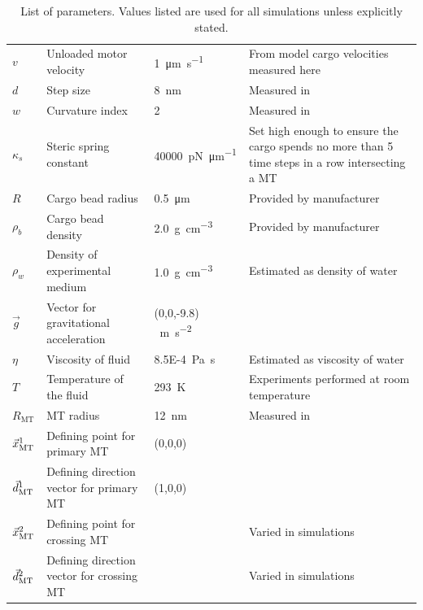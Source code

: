 \begin{table}
\begin{tabular}{p{.08\linewidth} p{.3\linewidth} p{.15\linewidth} p{.3\linewidth}}
$v$ & Unloaded motor velocity & \SI{1}{\micro\meter\per\second} & From model cargo velocities measured here \\

$d$ & Step size & \SI{8}{\nano\meter} & Measured in \cite{Svoboda1993} \\

$w$ & Curvature index & \num{2} & Measured in \cite{Visscher1999,Fallesen2011}  \\ \hline

$\kappa_s$ & Steric spring constant & \SI{40000}{\pico\newton\per\micro\meter} & Set high enough to ensure the cargo spends no more than 5 time steps in a row intersecting a MT \\

$R$ & Cargo bead radius & \SI{.5}{\micro\meter} & Provided by manufacturer \\

$\rho_b$ & Cargo bead density & \SI{2.0}{\gram\per\centi\meter^3} & Provided by manufacturer\\

$\rho_w$ & Density of experimental medium & \SI{1.0}{\gram\per\centi\meter^3} & Estimated as density of water \\

$\vec{g}$ & Vector for gravitational acceleration & (0,0,-9.8) \SI{}{\meter\per\second^2} & \\

$\eta$ & Viscosity of fluid & \SI{8.5E-4}{\pascal\second} & Estimated as viscosity of water \\

$T$ & Temperature of the fluid & \SI{293}{\kelvin} & Experiments performed at room temperature \\ \hline

$R_\text{MT}$ & MT radius & \SI{12}{\nano\meter} & Measured in \cite{Grimstone1966} \\

$\vec{x}_\text{MT}^1$ & Defining point for primary MT & (0,0,0) & \\

$\vec{d}_\text{MT}^1$ & Defining direction vector for primary MT & (1,0,0) & \\

$\vec{x}_\text{MT}^2$ & Defining point for crossing MT &  & Varied in simulations \\

$\vec{d}_\text{MT}^2$ & Defining direction vector for crossing MT &  & Varied in simulations \\

\end{tabular}
\caption[List of parameter values used]{List of parameters. Values listed are used for all simulations unless explicitly stated.} \label{tab:params}
\end{table}

